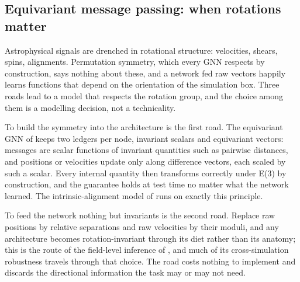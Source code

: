 
\subsection{Equivariant message passing: when rotations matter}
\label{subsec:equivariant-mp}

Astrophysical signals are drenched in rotational structure: velocities, shears, spins, alignments. Permutation symmetry, which every GNN respects by construction, says nothing about these, and a network fed raw vectors happily learns functions that depend on the orientation of the simulation box. Three roads lead to a model that respects the rotation group, and the choice among them is a modelling decision, not a technicality.

To build the symmetry into the architecture is the first road. The equivariant GNN of \citet{Satorras2021_EGNN_equivariant} keeps two ledgers per node, invariant scalars and equivariant vectors: messages are scalar functions of invariant quantities such as pairwise distances, and positions or velocities update only along difference vectors, each scaled by such a scalar. Every internal quantity then transforms correctly under E(3) by construction, and the guarantee holds at test time no matter what the network learned. The intrinsic-alignment model of \citet{Jagvaral2022_intrinsicalignment_GNN} runs on exactly this principle.

To feed the network nothing but invariants is the second road. Replace raw positions by relative separations and raw velocities by their moduli, and any architecture becomes rotation-invariant through its diet rather than its anatomy; this is the route of the field-level inference of \citet{deSanti2023_fieldlevel_LFI}, and much of its cross-simulation robustness travels through that choice. The road costs nothing to implement and discards the directional information the task may or may not need.

